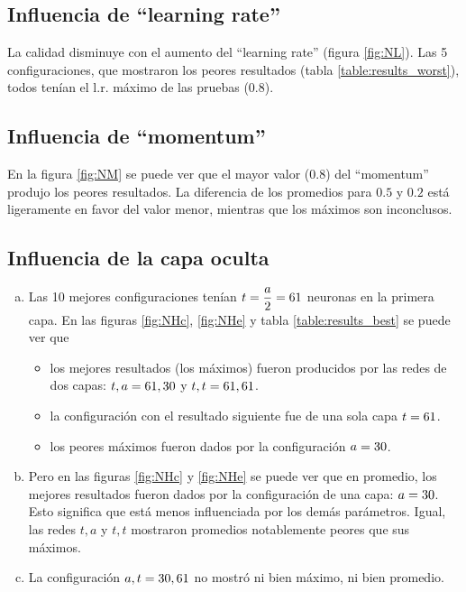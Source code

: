 \documentclass{article}
\begin{document}
\subsection{Influencia de ``learning rate''}
La calidad disminuye con el aumento del ``learning rate'' (figura \ref{fig:NL}). 
Las 5 configuraciones, que mostraron los peores resultados (tabla \ref{table:results_worst}), todos tenían el l.r. máximo de las pruebas (0.8).

\subsection{Influencia de ``momentum''}
En la figura \ref{fig:NM} se puede ver que el mayor valor (0.8) del ``momentum''         
produjo los peores resultados. La diferencia de los promedios para $0.5$ y $0.2$ está 
ligeramente en favor del valor menor, mientras que los máximos son inconclusos.

\subsection{Influencia de la capa oculta}
\begin{enumerate}[a).]
\item Las 10 mejores configuraciones tenían $t=\dfrac{a}{2} = 61$ neuronas en la primera 
      capa. En las figuras \ref{fig:NHc}, \ref{fig:NHe} y tabla \ref{table:results_best} se 
      puede ver que
      \begin{itemize}
          \item los mejores resultados (los máximos) fueron producidos por las redes de dos 
                capas: $t,a = 61,30$ y $t,t = 61,61$.
          \item la configuración con el resultado siguiente fue de una sola capa $t=61$.
          \item los peores máximos fueron dados por la configuración $a=30$.
      \end{itemize}
\item Pero en las figuras \ref{fig:NHc} y \ref{fig:NHe} se puede ver que en promedio, 
      los mejores resultados fueron dados por la configuración de una capa: $a=30$. Esto significa que está menos influenciada por los 
      demás parámetros.
      Igual, las redes $t,a$ y $t,t$ mostraron promedios notablemente peores que sus 
      máximos.
\item La configuración $a,t=30,61$ no mostró ni bien máximo, ni bien promedio.
\end{enumerate}
\end{document}
